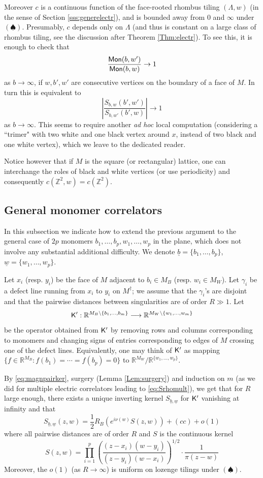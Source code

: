 \documentclass[10pt]{article}
\newcommand{\Z}{\mathbb{Z}}
\newcommand{\R}{\mathbb{R}}
\newcommand{\rK}{{\sf K}}
\newcommand{\dg}{\dagger}
\newcommand{\Mon}{{\sf Mon}}
\begin{document}
Moreover $c$ is a continuous function of the face-rooted rhombus tiling $(\Lambda,w)$ (in the sense of Section \ref{sss:generelectr}), and is bounded away from $0$ and $\infty$ under $(\spadesuit)$. Presumably, $c$ depends only on $\Lambda$ (and thus is constant on a large class of rhombus tiling, see the discussion after Theorem \ref{Thm:electr}). To see this, it is enough to check that 
$$\frac{\Mon(b,w')}{\Mon(b,w)}\rightarrow 1$$
as $b\rightarrow\infty$, if $w,b',w'$ are consecutive vertices on the boundary of a face of $M$. In turn this is equivalent to
$$\left|\frac{S_{b,w}(b',w')}{S_{b,w'}(b',w)}\right|\rightarrow 1$$
as $b\rightarrow\infty$. This seems to require another {\em ad hoc} local computation (considering a ``trimer" with two white and one black vertex around $x$, instead of two black and one white vertex), which we leave to the dedicated reader.

Notice however that if $M$ is the square (or rectangular) lattice, one can interchange the roles of black and white vertices (or use periodicity) and consequently $c(\Z^2,w)=c(\Z^2)$.


\subsection{General monomer correlators}\label{subsec:generalmono}

In this subsection we indicate how to extend the previous argument to the general case of $2p$ monomers $b_1,\dots,b_p,w_1,\dots,w_p$ in the plane, which does not involve any substantial additional difficulty. We denote $\underline b=\{b_1,\dots,b_p\}$, $\underline w=\{w_1,\dots,w_p\}$.
 
Let $x_i$ (resp. $y_i$) be the face of $M$ adjacent to $b_i\in M_B$ (resp. $w_i\in M_W$). Let $\gamma_i$ be a defect line running from $x_i$ to $y_i$ on $M^\dg$; we assume that the $\gamma_i$'s are disjoint and that the pairwise distances between singularities are of order $R\gg1$. Let
$$\rK':\R^{M_B\setminus\{b_1,\dots,b_m\}}\longrightarrow
\R^{M_W\setminus\{w_1,\dots,w_m\}}$$
be the operator obtained from $\rK'$ by removing rows and columns corresponding to monomers and changing signs of entries corresponding to edges of $M$ crossing one of the defect lines. Equivalently, one may think of $\rK'$ as mapping $\{f\in\R^{M_B}:f(b_1)=\cdots=f(b_p)=0\}$ to $\R^{M_W}/\R^{\{w_1,\dots,w_p\}}$. 

By \eqref{eq:magnpairker}, surgery (Lemma \ref{Lem:surgery}) and induction on $m$ (as we did for multiple electric correlators leading to \eqref{eq:Srhomult}), we get that for $R$ large enough, there exists a unique inverting kernel $S_{\underline{b},\underline{w}}$ for $\rK'$ vanishing at infinity and that
$$S_{\underline{b},\underline{w}}(z,w)=\frac 12R_B\left(e^{i\nu(w)}S(z,w)\right)+(cc)+o(1)$$
where all pairwise distances are of order $R$ and $S$ is the continuous kernel 
$$S(z,w)=
\prod_{i=1}^p\left(\frac{(z-x_i)(w-y_i)}{(z-y_i)(w-x_i)}\right)^{1/2}\cdot\frac{1}{\pi(z-w)}$$
Moreover, the $o(1)$ (as $R\rightarrow\infty$) is uniform on lozenge tilings under $(\spadesuit)$. 
\end{document}
